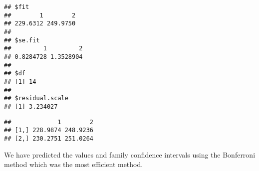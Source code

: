 \documentclass[
]{article}
\newenvironment{Shaded}{\begin{snugshade}}{\end{snugshade}}
\newcommand{\DecValTok}[1]{\textcolor[rgb]{0.00,0.00,0.81}{#1}}
\newcommand{\FloatTok}[1]{\textcolor[rgb]{0.00,0.00,0.81}{#1}}
\newcommand{\KeywordTok}[1]{\textcolor[rgb]{0.13,0.29,0.53}{\textbf{#1}}}
\newcommand{\NormalTok}[1]{#1}
\newcommand{\OperatorTok}[1]{\textcolor[rgb]{0.81,0.36,0.00}{\textbf{#1}}}
\newcommand{\StringTok}[1]{\textcolor[rgb]{0.31,0.60,0.02}{#1}}
\begin{document}
\begin{verbatim}
## $fit
##        1        2 
## 229.6312 249.9750 
## 
## $se.fit
##         1         2 
## 0.8284728 1.3528904 
## 
## $df
## [1] 14
## 
## $residual.scale
## [1] 3.234027
\end{verbatim}

\begin{Shaded}
\end{Shaded}

\begin{verbatim}
##             1        2
## [1,] 228.9874 248.9236
## [2,] 230.2751 251.0264
\end{verbatim}

We have predicted the values and family confidence intervals using the
Bonferroni method which was the most efficient method.
\end{document}
